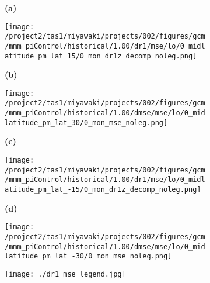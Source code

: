 \documentclass[preview]{standalone}
\begin{document}
\begin{figure}
  \begin{subfigure}[t]{0.05\textwidth}
    \textbf{\large{(a)}}
  \end{subfigure}
  \begin{subfigure}[t]{0.45\textwidth}
    \texttt{[image: /project2/tas1/miyawaki/projects/002/figures/gcm/mmm\_piControl/historical/1.00/dr1/mse/lo/0\_midlatitude\_pm\_lat\_15/0\_mon\_dr1z\_decomp\_noleg.png]}
  \end{subfigure}
  \begin{subfigure}[t]{0.05\textwidth}
    \textbf{\large{(b)}}
  \end{subfigure}
  \begin{subfigure}[t]{0.45\textwidth}
    \texttt{[image: /project2/tas1/miyawaki/projects/002/figures/gcm/mmm\_piControl/historical/1.00/dmse/mse/lo/0\_midlatitude\_pm\_lat\_30/0\_mon\_mse\_noleg.png]}
  \end{subfigure}

  \begin{subfigure}[t]{0.05\textwidth}
    \textbf{\large{(c)}}
  \end{subfigure}
  \begin{subfigure}[t]{0.45\textwidth}
    \texttt{[image: /project2/tas1/miyawaki/projects/002/figures/gcm/mmm\_piControl/historical/1.00/dr1/mse/lo/0\_midlatitude\_pm\_lat\_-15/0\_mon\_dr1z\_decomp\_noleg.png]}
  \end{subfigure}
  \begin{subfigure}[t]{0.05\textwidth}
    \textbf{\large{(d)}}
  \end{subfigure}
  \begin{subfigure}[t]{0.45\textwidth}
    \texttt{[image: /project2/tas1/miyawaki/projects/002/figures/gcm/mmm\_piControl/historical/1.00/dmse/mse/lo/0\_midlatitude\_pm\_lat\_-30/0\_mon\_mse\_noleg.png]}
  \end{subfigure}

  \begin{subfigure}[t]{\textwidth}
    \texttt{[image: ./dr1\_mse\_legend.jpg]}
  \end{subfigure}

\end{figure}
\end{document}
